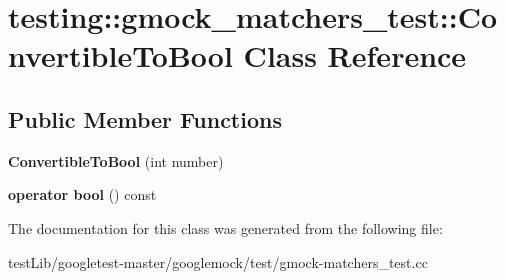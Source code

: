 \hypertarget{classtesting_1_1gmock__matchers__test_1_1ConvertibleToBool}{}\section{testing\+:\+:gmock\+\_\+matchers\+\_\+test\+:\+:Convertible\+To\+Bool Class Reference}
\label{classtesting_1_1gmock__matchers__test_1_1ConvertibleToBool}
\subsection*{Public Member Functions}
\begin{DoxyCompactItemize}
\item 
\mbox{\label{classtesting_1_1gmock__matchers__test_1_1ConvertibleToBool_a4e01a99e144a393bc11a40fb43e8a6f1}} 
{\bfseries Convertible\+To\+Bool} (int number)
\item 
\mbox{\label{classtesting_1_1gmock__matchers__test_1_1ConvertibleToBool_a4ad9766b9d5179a1207af2449405f071}} 
{\bfseries operator bool} () const
\end{DoxyCompactItemize}


The documentation for this class was generated from the following file\+:\begin{DoxyCompactItemize}
\item 
test\+Lib/googletest-\/master/googlemock/test/gmock-\/matchers\+\_\+test.\+cc\end{DoxyCompactItemize}
